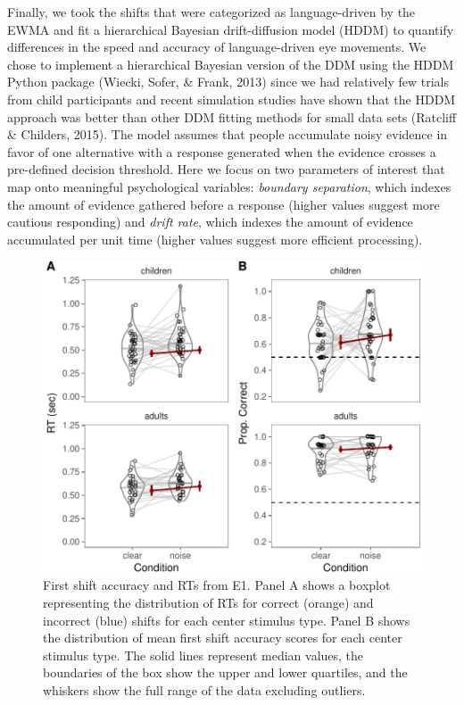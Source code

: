 \documentclass[10pt, letterpaper]{article}
\newenvironment{CodeChunk}{}{}
\begin{document}
Finally, we took the shifts that were categorized as language-driven by
the EWMA and fit a hierarchical Bayesian drift-diffusion model (HDDM) to
quantify differences in the speed and accuracy of language-driven eye
movements. We chose to implement a hierarchical Bayesian version of the
DDM using the HDDM Python package (Wiecki, Sofer, \& Frank, 2013) since
we had relatively few trials from child participants and recent
simulation studies have shown that the HDDM approach was better than
other DDM fitting methods for small data sets (Ratcliff \& Childers,
2015). The model assumes that people accumulate noisy evidence in favor
of one alternative with a response generated when the evidence crosses a
pre-defined decision threshold. Here we focus on two parameters of
interest that map onto meaningful psychological variables:
\emph{boundary separation}, which indexes the amount of evidence
gathered before a response (higher values suggest more cautious
responding) and \emph{drift rate}, which indexes the amount of evidence
accumulated per unit time (higher values suggest more efficient
processing).

\begin{CodeChunk}
\begin{figure}[t]

{\centering \includegraphics{figs/e1_acc_rt-1} 

}

\caption[First shift accuracy and RTs from E1]{First shift accuracy and RTs from E1. Panel A shows a boxplot representing the distribution of RTs for correct (orange) and incorrect (blue) shifts for each center stimulus type. Panel B shows the distribution of mean first shift accuracy scores for each center stimulus type. The solid lines represent median values, the boundaries of the box show the upper and lower quartiles, and the whiskers show the full range of the data excluding outliers.}\label{fig:e1_acc_rt}
\end{figure}
\end{CodeChunk}
\end{document}
